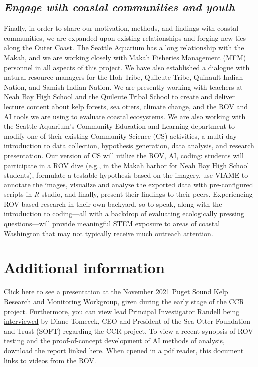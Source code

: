 \documentclass[11pt]{article}
\begin{document}
\subsection{\textit{Engage with coastal communities and youth}}
Finally, in order to share our motivation, methods, and findings with 
coastal communities, we are expanded upon existing relationships 
and forging new ties along the Outer Coast. 
The Seattle Aquarium has a long relationship with the Makah, and we are 
working closely with Makah Fisheries Management (MFM) personnel in all 
aspects of this project. 
We have also established a dialogue with natural resource managers for 
the Hoh Tribe, Quileute Tribe, Quinault Indian Nation, and Samish 
Indian Nation. 
We are presently working with teachers at Neah Bay High School and the 
Quileute Tribal School to create and deliver lecture content about kelp 
forests, sea otters, climate change, and the ROV and AI tools we are 
using to evaluate coastal ecosystems.
We are also working with the Seattle Aquarium's Community Education and 
Learning department to modify one of their existing Community Science 
(CS) activities, a multi-day introduction to data collection, 
hypothesis generation, data analysis, and research presentation.
Our version of CS will utilize the ROV, AI, coding: students will 
participate in a ROV dive (e.g., in the Makah harbor for Neah Bay High 
School students),
formulate a testable hypothesis based on the imagery, 
use VIAME to annotate the images,
visualize and analyze the exported data with pre-configured scripts in 
\textit{R}-studio, and finally, present their findings to their peers. 
Experiencing ROV-based research in their own backyard, so to speak, 
along with the introduction to coding---all with a backdrop of 
evaluating ecologically pressing questions---will provide meaningful 
STEM exposure to areas of coastal Washington that may not typically 
receive much outreach attention. 





\section{Additional information}
\label{Additional information}
Click \href{https://www.youtube.com/watch?v=q3xT6H-Ufks\&t=1702s}{here} 
to see a presentation at the November 2021 Puget Sound Kelp Research 
and 
Monitoring Workgroup, given during the early stage of the CCR project. 
Furthermore, you can view lead Principal Investigator Randell being 
\href{https://www.youtube.com/watch?v=KDEc3Q2V5XQ\&ab_channel=SeaOtterFoundation\%26Trust}{interviewed}
 by Diane Tomecek, CEO and President of the Sea Otter 
Foundation and Trust (SOFT) regarding the CCR project. 
To view a recent synopsis of ROV testing and the proof-of-concept 
development of AI methods of analysis, download the report linked 
\href{https://drive.google.com/file/d/1PeGnilFcc_J5Gx2AwyMfiZZa_116hup7/view?usp=sharing}{here}.
When opened in a pdf reader, this document links to videos from the ROV.
\end{document}
